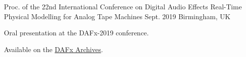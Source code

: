 \begin{cventries}
  \cventry
    {Proc. of the 22nd International Conference on Digital Audio Effects} %
    {Real-Time Physical Modelling for Analog Tape Machines} %
    {Sept. 2019} %
    {Birmingham, UK} %
    {
      \begin{cvitems} %
        \item {Oral presentation at the DAFx-2019 conference.}
        \item {Available on the \href{http://www.dafx.de/paper-archive/2019/DAFx2019_paper_3.pdf}{DAFx Archives}.}
      \end{cvitems}
    }



\end{cventries}
